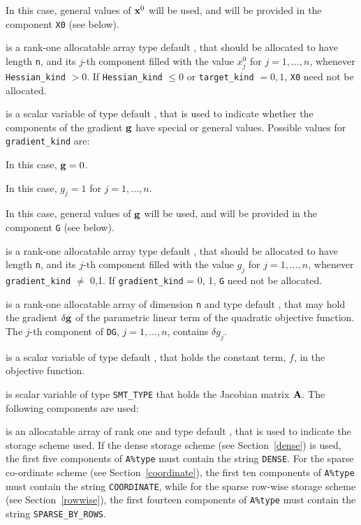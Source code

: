 \documentclass{galahad}
\begin{document}
\begin{description}
\begin{description}
 In this case, general values of ${\mathbf{x}}^0$ will be used,
     and will be provided in the component {\tt X0} (see below).
\end{description}

 is a rank-one allocatable array type default \realdp, that
should be allocated to have length {\tt n}, and its $j$-th component
filled with the value $x_{j}^0$ for $j = 1, \ldots , n$,
whenever {\tt Hessian\_kind} $>0$.
If {\tt Hessian\_kind} $\leq 0$  or {\tt target\_kind} $= 0,1$,
{\tt X0} need not be allocated.

 is a scalar variable of type default \integer,
that is used to indicate whether the components of the gradient ${\mathbf{g}}$
have special or general values. Possible values for {\tt gradient\_kind} are:
\begin{description}
  In this case, ${\mathbf{g}} = 0$.

 In this case, $g_{j} = 1$ for $j = 1, \ldots , n$.

 In this case, general values of ${\mathbf{g}}$ will be used,
     and will be provided in the component {\tt G} (see below).
\end{description}

 is a rank-one allocatable array type default \realdp, that
should be allocated to have length {\tt n}, and its $j$-th component
filled with the value $g_{j}$ for $j = 1, \ldots , n$,
whenever {\tt gradient\_kind} $\neq$ 0,1.
If {\tt gradient\_kind} {= 0, 1}, {\tt G} need not be allocated.

 is a rank-one allocatable array of dimension {\tt n} and type
default \realdp, that may hold the gradient $\delta {\mathbf{g}}$
of the parametric linear term of the quadratic objective function.
The $j$-th component of
{\tt DG}, $j = 1,  \ldots ,  n$, contains $\delta g_{j}$.

 is a scalar variable of type
default \realdp, that holds
the constant term, $f$, in the objective function.

 is scalar variable of type {\tt SMT\_TYPE}
that holds the Jacobian matrix ${\mathbf{A}}$. The following components are used:

\begin{description}

 is an allocatable array of rank one and type default \character,
that is used to indicate the storage scheme used. If the dense storage scheme
(see Section~\ref{dense}) is used,
the first five components of {\tt A\%type} must contain the
string {\tt DENSE}.
For the sparse co-ordinate scheme (see Section~\ref{coordinate}),
the first ten components of {\tt A\%type} must contain the
string {\tt COORDINATE}, while
for the sparse row-wise storage scheme (see Section~\ref{rowwise}),
the first fourteen components of {\tt A\%type} must contain the
string {\tt SPARSE\_BY\_ROWS}.


\end{description}
\end{description}
\end{document}

